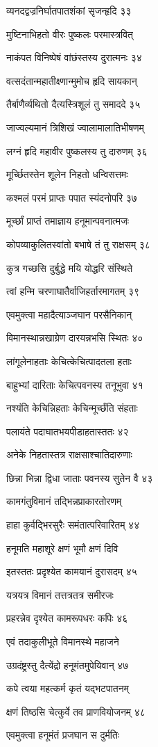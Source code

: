 व्यनदद्वज्रनिर्घातपातशंकां सृजन्हृदि ३३

मुष्टिनाभिहतो वीरः पुष्कलः परमास्त्रवित्

नाकंपत विनिष्पेषं वांछंस्तस्य दुरात्मनः ३४

वत्सदंतान्महातीक्ष्णान्मुमोच हृदि सायकान्

तैर्बाणैर्व्यथितो दैत्यस्त्रिशूलं तु समाददे ३५

जाज्वल्यमानं त्रिशिखं ज्वालामालातिभीषणम्

लग्नं हृदि महावीर पुष्कलस्य तु दारुणम् ३६

मूर्च्छितस्तेन शूलेन निहतो धन्विसत्तमः

कश्मलं परमं प्राप्तः पपात स्यंदनोपरि ३७

मूर्च्छां प्राप्तं तमाज्ञाय हनूमान्पवनात्मजः

कोपव्याकुलितस्वांतो बभाषे तं तु राक्षसम् ३८

कुत्र गच्छसि दुर्बुद्धे मयि योद्धरि संस्थिते

त्वां हन्मि चरणाघातैर्वाजिहर्तारमागतम् ३९

एवमुक्त्वा महादैत्याञ्जघान परसैनिकान्

विमानस्थान्नखाग्रेण दारयन्नभसि स्थितः ४०

लांगूलेनाहताः केचित्केचित्पादतला हताः

बाहुभ्यां दारिताः केचित्पवनस्य तनूभुवा ४१

नश्यंति केचिन्निहताः केचिन्मूर्च्छंति संहताः

पलायंते पदाघातभयपीडाहतास्ततः ४२

अनेके निहतास्तत्र राक्षसाश्चातिदारुणाः

छिन्ना भिन्ना द्विधा जाताः पवनस्य सुतेन वै ४३

कामगंतुविमानं तद्भिन्नप्राकारतोरणम्

हाहा कुर्वद्भिरसुरैः समंतात्परिवारितम् ४४

हनूमति महाशूरे क्षणं भूमौ क्षणं दिवि

इतस्ततः प्रदृश्येत कामयानं दुरासदम् ४५

यत्रयत्र विमानं तत्तत्रतत्र समीरजः

प्रहरन्नेव दृश्येत कामरूपधरः कपिः ४६

एवं तदाकुलीभूते विमानस्थे महाजने

उग्रदंष्ट्रस्तु दैत्येंद्रो हनूमंतमुपेयिवान् ४७

कपे त्वया महत्कर्म कृतं यद्भटपातनम्

क्षणं तिष्ठसि चेत्कुर्वे तव प्राणवियोजनम् ४८

एवमुक्त्वा हनूमंतं प्रजघान स दुर्मतिः


